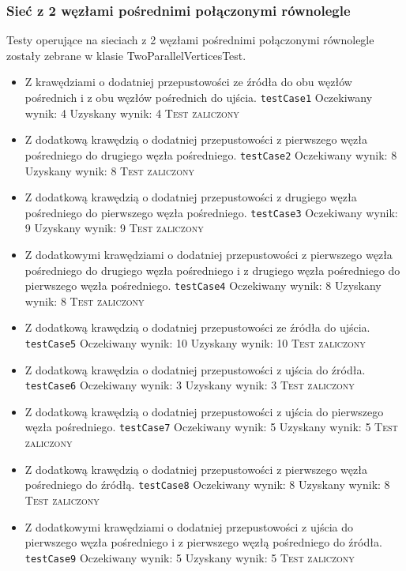 \subsubsection{Sieć z 2 węzłami pośrednimi połączonymi równolegle}
Testy operujące na sieciach z 2 węzłami pośrednimi połączonymi równolegle zostały
zebrane w klasie TwoParallelVerticesTest.
\begin{itemize}[nosep]
    \item Z krawędziami o dodatniej przepustowości ze źródła do obu węzłów
    pośrednich i z obu węzłów pośrednich do ujścia.
    \texttt{testCase1}
    Oczekiwany wynik: 4
    Uzyskany wynik: 4
    \textsc{Test zaliczony}


    \item Z dodatkową krawędzią o dodatniej przepustowości z pierwszego węzła
    pośredniego do drugiego węzła pośredniego.
    \texttt{testCase2}
    Oczekiwany wynik: 8
    Uzyskany wynik: 8
    \textsc{Test zaliczony}

    \item Z dodatkową krawędzią o dodatniej przepustowości z drugiego węzła
    pośredniego do pierwszego węzła pośredniego.
    \texttt{testCase3}
    Oczekiwany wynik: 9
    Uzyskany wynik: 9
    \textsc{Test zaliczony}

    \item Z dodatkowymi krawędziami o dodatniej przepustowości z pierwszego
    węzła pośredniego do drugiego węzła pośredniego i z drugiego węzła
    pośredniego do pierwszego węzła pośredniego.
    \texttt{testCase4}
    Oczekiwany wynik: 8
    Uzyskany wynik: 8
    \textsc{Test zaliczony}

    \item Z dodatkową krawędzią o dodatniej przepustowości ze źródła do ujścia.
    \texttt{testCase5}
    Oczekiwany wynik: 10
    Uzyskany wynik: 10
    \textsc{Test zaliczony}

    \item Z dodatkową krawędzia o dodatniej przepustowości z ujścia do źródła.
    \texttt{testCase6}
    Oczekiwany wynik: 3
    Uzyskany wynik: 3
    \textsc{Test zaliczony}

    \item Z dodatkową krawędzią o dodatniej przepustowości z ujścia do
    pierwszego węzła pośredniego.
    \texttt{testCase7}
    Oczekiwany wynik: 5
    Uzyskany wynik: 5
    \textsc{Test zaliczony}

    \item Z dodatkową krawędzią o dodatniej przepustowości z pierwszego węzła
    pośredniego do źródłą.
    \texttt{testCase8}
    Oczekiwany wynik: 8
    Uzyskany wynik: 8
    \textsc{Test zaliczony}

    \item Z dodatkowymi krawędziami o dodatniej przepustowości z ujścia do
    pierwszego węzła pośredniego i z pierwszego węzłą pośredniego do źródła.
    \texttt{testCase9}
    Oczekiwany wynik: 5
    Uzyskany wynik: 5
    \textsc{Test zaliczony}
\end{itemize}


